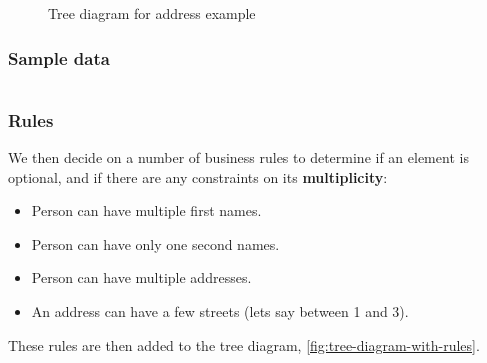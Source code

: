 \documentclass[slides]{pgnotes}
\begin{document}
\begin{figure}[htbp]
  \centering
  \caption{Tree diagram for address example}
  \label{fig:tree-diagram}
\end{figure}

\subsubsection{Sample data}

\inputminted{xml}{sampledata.xml}

\subsubsection{Rules}

We then decide on a number of business rules to determine if an element is optional, and if there are any constraints on its \textbf{multiplicity}: 

\begin{itemize}
\item Person can have multiple first names.
\item Person can have only one second names.
\item Person can have multiple addresses.
\item An address can have a few streets (lets say between 1 and 3).
\end{itemize}

These rules are then added to the tree diagram, \autoref{fig:tree-diagram-with-rules}. 
\end{document}
